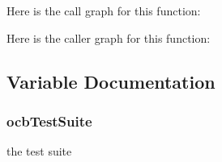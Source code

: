 Here is the call graph for this function\+:




Here is the caller graph for this function\+:




\subsection{Variable Documentation}
\subsubsection[{\texorpdfstring{ocb\+Test\+Suite}{ocbTestSuite}}]{ ocb\+Test\+Suite\hspace{0.3cm}{\ttfamily [static]}}\hypertarget{ocb-test-suite_8cc_ac027b902bb590530fbce2aa41a84e649}{}\label{ocb-test-suite_8cc_ac027b902bb590530fbce2aa41a84e649}


the test suite 

